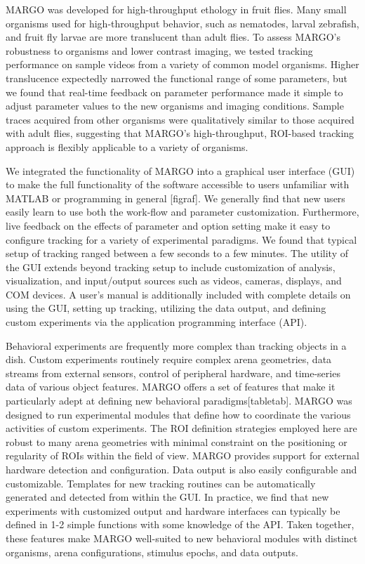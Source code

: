 \documentclass[10pt]{article}
\begin{document}
\begin{multicols}{2}
MARGO was developed for high-throughput ethology in fruit flies. Many small organisms used for high-throughput behavior, such as nematodes, larval zebrafish, and fruit fly larvae are more translucent than adult flies. To assess MARGO’s robustness to organisms and lower contrast imaging, we tested tracking performance on sample videos from a variety of common model organisms. Higher translucence expectedly narrowed the functional range of some parameters, but we found that real-time feedback on parameter performance made it simple to adjust parameter values to the new organisms and imaging conditions. Sample traces acquired from other organisms were qualitatively similar to those acquired with adult flies, suggesting that MARGO’s high-throughput, ROI-based tracking approach is flexibly applicable to a variety of organisms. 

We integrated the functionality of MARGO into a graphical user interface (GUI) to make the full functionality of the software accessible to users unfamiliar with MATLAB or programming in general [figraf]. We generally find that new users easily learn to use both the work-flow and parameter customization. Furthermore, live feedback on the effects of parameter and option setting make it easy to configure tracking for a variety of experimental paradigms. We found that typical setup of tracking ranged between a few seconds to a few minutes. The utility of the GUI extends beyond tracking setup to include customization of analysis, visualization, and input/output sources such as videos, cameras, displays, and COM devices. A user's manual is additionally included with complete details on using the GUI, setting up tracking, utilizing the data output, and defining custom experiments via the application programming interface (API).

Behavioral experiments are frequently more complex than tracking objects in a dish. Custom experiments routinely require complex arena geometries, data streams from external sensors, control of peripheral hardware, and time-series data of various object features. MARGO offers a set of features that make it particularly adept at defining new behavioral paradigms[tabletab]. MARGO was designed to run experimental modules that define how to coordinate the various activities of custom experiments. The ROI definition strategies employed here are robust to many arena geometries with minimal constraint on the positioning or regularity of ROIs within the field of view. MARGO provides support for external hardware detection and configuration. Data output is also easily configurable and customizable. Templates for new tracking routines can be automatically generated and detected from within the GUI. In practice, we find that new experiments with customized output and hardware interfaces can typically be defined in 1-2 simple functions with some knowledge of the API. Taken together, these features make MARGO well-suited to new behavioral modules with distinct organisms, arena configurations, stimulus epochs, and data outputs.



\end{multicols}
\end{document}
